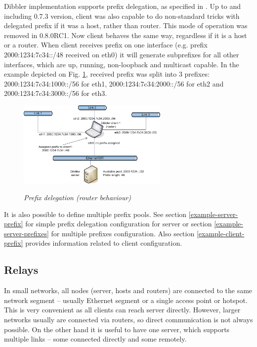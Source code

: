Dibbler implementation supports prefix delegation, as specified in
\cite{rfc3633}. Up to and including 0.7.3 version, client was also
capable to do non-standard tricks with delegated prefix if it was a
host, rather than router. This mode of operation was removed in
0.8.0RC1. Now client behaves the same way, regardless if it is a 
host or a router. When
client receives prefix on one interface (e.g. prefix
2000:1234:7c34::/48 received on eth0) it will generate subprefixes for
all other interfaces, which are up, running, non-loopback and
multicast capable. In the example depicted on
Fig. \ref{fig-prefixes-router}, received prefix was split into 3
prefixes: 2000:1234:7c34:1000::/56 for eth1, 2000:1234:7c34:2000::/56 for eth2
and 2000:1234:7c34:3000::/56 for eth3.

\begin{figure}[ht]
\begin{center}
\label{fig-prefixes-router}
\includegraphics[width=0.65\textwidth]{dibbler-prefixes-router}
\caption{\emph{Prefix delegation (router behaviour)}}
\end{center}
\end{figure}

It is also possible to define multiple prefix pools. See section
\ref{example-server-prefix} for simple prefix delegation configuration
for server or section \ref{example-server-prefixes} for multiple
prefixes configuration. Also section \ref{example-client-prefix}
provides information related to client configuration.

\subsection{Relays}
\label{features-relays}
In small networks, all nodes (server, hosts and routers) are connected
to the same network segment -- usually Ethernet segment or a single
access point or hotspot. This is very convenient as all clients can
reach server directly. However, larger networks usually are connected
via routers, so direct communication is not always possible. On the
other hand it is useful to have one server, which supports multiple
links -- some connected directly and some remotely.

